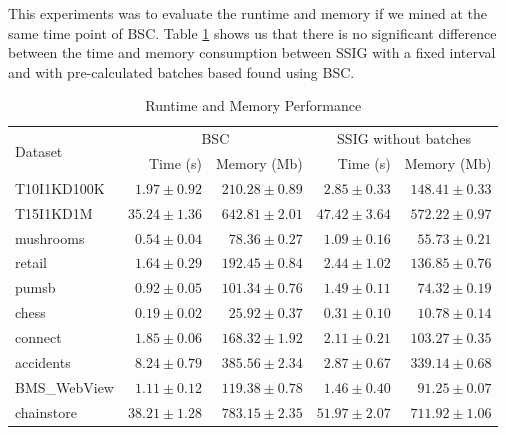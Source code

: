 This experiments was to evaluate the runtime and memory if we mined at the same time point of BSC.
Table \ref{tb:time1}  shows us that there is no significant difference between the time and memory consumption between SSIG with a fixed interval and with pre-calculated batches based  found using BSC. 

\begin{table}[h!]
\caption{Runtime and Memory Performance}
\label{tb:time1}
\begin{center}
\addtolength{\tabcolsep}{5.0pt}
\begin{tabular}{lrrrr}
    \toprule
    \multirow{2}{*}{Dataset} &
      \multicolumn{2}{c}{BSC} &
      \multicolumn{2}{c}{SSIG without batches} \\
      & {Time (s)} & {Memory (Mb)} & {Time (s)} & {Memory (Mb)} \\
      \midrule
    T10I1KD100K & \textbf{\(1.97\pm 0.92\)} & {\(210.28\pm 0.89\)} & {\(2.85\pm 0.33\)} & {\(148.41\pm 0.33\)} \\
    T15I1KD1M & \textbf{\(35.24\pm 1.36\)} & {\(642.81\pm 2.01\)} & {\(47.42\pm 3.64\)} & {\(572.22\pm 0.97\)} \\
    mushrooms & \textbf{\(0.54\pm 0.04\)} & {\(78.36\pm 0.27\)} & {\(1.09\pm 0.16\)} & {\(55.73\pm 0.21\)} \\
    retail & \textbf{\(1.64 \pm 0.29\)} & {\(192.45\pm 0.84\)}& {\(2.44\pm 1.02\)} & {\(136.85\pm 0.76\)}\\
    pumsb & \textbf{\(0.92\pm 0.05\)} & {\(101.34\pm0.76\)}& {\(1.49\pm0.11\)} & {\(74.32\pm 0.19\)}\\
    chess & \textbf{\(0.19\pm0.02\)} & {\(25.92\pm0.37\)}& {\(0.31\pm0.10\)} & {\(10.78\pm0.14\)}\\
    connect & \textbf{\(1.85\pm 0.06\)} & {\(168.32\pm1.92\)}& {\(2.11\pm 0.21\)} & {\(103.27\pm0.35\)}\\
    accidents & \textbf{\(8.24\pm0.79\)} & {\(385.56\pm2.34\)}& {\(2.87\pm0.67\)} & {\(339.14\pm0.68\)}\\
    BMS\_WebView & \textbf{\(1.11\pm0.12\)} & {\(119.38\pm0.78\)}& {\(1.46\pm0.40\)} & {\(91.25\pm0.07\)}\\
    chainstore & \textbf{\(38.21\pm1.28\)} & {\(783.15\pm2.35\)}& {\(51.97\pm2.07\)} & {\(711.92\pm1.06\)}\\
    \bottomrule
\end{tabular}

\noalign{\smallskip}


\end{center}
\end{table}

